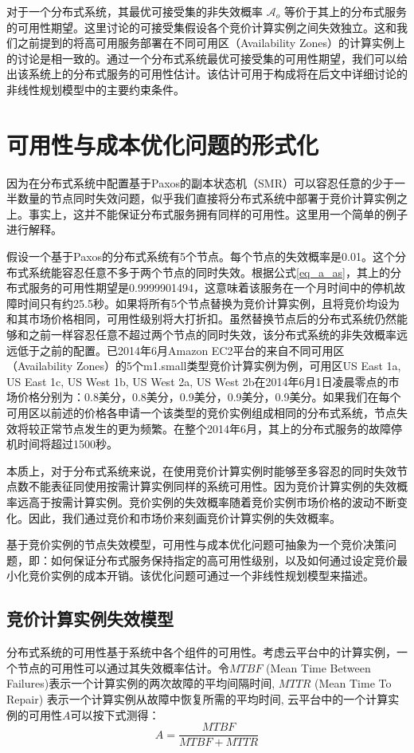 对于一个分布式系统，其最优可接受集的非失效概率 $\mathcal{A}_{o}$ 等价于其上的分布式服务的可用性期望。这里讨论的可接受集假设各个竞价计算实例之间失效独立。这和我们之前提到的将高可用服务部署在不同可用区（Availability Zones）的计算实例上的讨论是相一致的。通过一个分布式系统最优可接受集的可用性期望，我们可以给出该系统上的分布式服务的可用性估计。该估计可用于构成将在后文中详细讨论的非线性规划模型中的主要约束条件。

\section{可用性与成本优化问题的形式化}
\label{jupiter-formulation}
因为在分布式系统中配置基于Paxos的副本状态机（SMR）可以容忍任意的少于一半数量的节点同时失效问题，似乎我们直接将分布式系统中部署于竞价计算实例之上。事实上，这并不能保证分布式服务拥有同样的可用性。这里用一个简单的例子进行解释。

假设一个基于Paxos的分布式系统有5个节点。每个节点的失效概率是0.01。这个分布式系统能容忍任意不多于两个节点的同时失效。根据公式\eqref{eq_a_as}，其上的分布式服务的可用性期望是0.9999901494，这意味着该服务在一个月时间中的停机故障时间只有约25.5秒。如果将所有5个节点替换为竞价计算实例，且将竞价均设为和其市场价格相同，可用性级别将大打折扣。虽然替换节点后的分布式系统仍然能够和之前一样容忍任意不超过两个节点的同时失效，该分布式系统的非失效概率远远低于之前的配置。已2014年6月Amazon EC2平台的来自不同可用区（Availability Zones）的5个m1.small类型竞价计算实例为例，可用区US East 1a, US East 1c, US West 1b, US West 2a, US West 2b在2014年6月1日凌晨零点的市场价格分别为：0.8美分，0.8美分，0.9美分，0.9美分，0.9美分。如果我们在每个可用区以前述的价格各申请一个该类型的竞价实例组成相同的分布式系统，节点失效将较正常节点发生的更为频繁。在整个2014年6月，其上的分布式服务的故障停机时间将超过1500秒。

本质上，对于分布式系统来说，在使用竞价计算实例时能够至多容忍的同时失效节点数不能表征同使用按需计算实例同样的系统可用性。因为竞价计算实例的失效概率远高于按需计算实例。竞价实例的失效概率随着竞价实例市场价格的波动不断变化。因此，我们通过竞价和市场价来刻画竞价计算实例的失效概率。

基于竞价实例的节点失效模型，可用性与成本优化问题可抽象为一个竞价决策问题，即：如何保证分布式服务保持指定的高可用性级别，以及如何通过设定竞价最小化竞价实例的成本开销。该优化问题可通过一个非线性规划模型来描述。

\subsection{竞价计算实例失效模型}
\label{jupiter-sifm}
分布式系统的可用性基于系统中各个组件的可用性。考虑云平台中的计算实例，一个节点的可用性可以通过其失效概率估计。令$MTBF$ (Mean Time Between Failures)表示一个计算实例的两次故障的平均间隔时间, $MTTR$ (Mean Time To Repair) 表示一个计算实例从故障中恢复所需的平均时间, 云平台中的一个计算实例的可用性$A$可以按下式测得：
\begin{equation}\label{eq_a}
A = \frac{MTBF}{MTBF+MTTR}
\end{equation}


